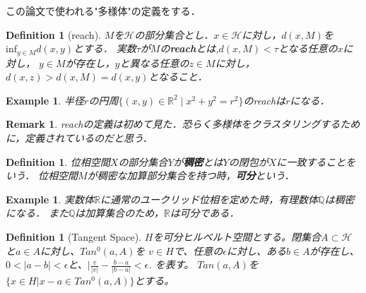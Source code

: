 \documentclass{ujarticle}
\newtheorem{dfn}[thm]{Definition}
\newtheorem{epl}[thm]{Example}
\newtheorem*{rem}{Remark}
\begin{document}
この論文で使われる"多様体"の定義をする．
\begin{dfn}[reach]
  $M$を$\mathcal{H}$の部分集合とし．$x\in \mathcal{H}$に対し，$d(x,M)$を$\mathrm{inf}_{y \in M}d(x,y)$とする．
  実数$\tau$が$M$の\textbf{reach}とは,$d(x,M)< \tau$となる任意の$x$に対し，
  $y\in M$が存在し，$y$と異なる任意の$z\in M$に対し，$d(x,z) > d(x,M)=d(x,y)$となること．
\end{dfn}
\begin{epl}
 半径$r$の円周$\{(x,y) \in \mathbb{R}^2 \mid x^2+y^2=r^2 \}$のreachは$r$になる．
\end{epl}
\begin{rem}
 reachの定義は初めて見た．恐らく多様体をクラスタリングするために，定義されているのだと思う．
\end{rem}
\begin{dfn}
 位相空間$X$の部分集合$Y$が\textbf{稠密}とは$Y$の閉包が$X$に一致することをいう．
 位相空間$M$が稠密な加算部分集合を持つ時，\textbf{可分}という．
\end{dfn}
\begin{epl}
 実数体$\mathbb{R}$に通常のユークリッド位相を定めた時，有理数体$\mathbb{Q}$は稠密になる．
 また$\mathbb{Q}$は加算集合のため，$\mathbb{R}$は可分である．
\end{epl}

\begin{dfn}[Tangent Space]
$H$を可分ヒルベルト空間とする。閉集合$A \subset \mathcal{H}$と$a \in A$に対し、$Tan^0(a,A)$を
$v \in H$で、任意の$\epsilon$に対し、ある$b \in A$が存在し、$0 <|a -b| < \epsilon$と、$|\frac{v}{|v|} - \frac{b-a}{|b-a|} < \epsilon$.
を表す。
$Tan(a,A)$を$\{x \in H| x -a \in Tan^0(a,A)\}$とする。
\end{dfn}
\end{document}
